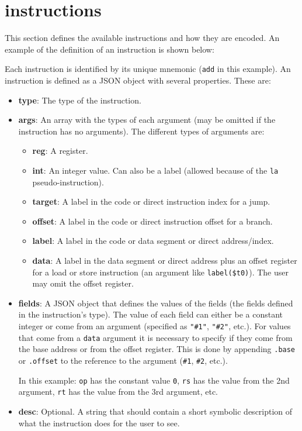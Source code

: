 \documentclass[11pt,a4paper,twoside,titlepage]{report}
\begin{document}
\section{instructions}

This section defines the available instructions and how they are encoded.
An example of the definition of an instruction is shown below:



Each instruction is identified by its unique mnemonic (\verb+add+ in this example).
An instruction is defined as a JSON object with several properties. These are:

\begin{itemize}
	\item \textbf{type}: The type of the instruction.
	\item \textbf{args}: An array with the types of each argument (may be omitted if
		the instruction has no arguments).
		The different types of arguments are:
		\begin{itemize}
			\item \textbf{reg}: A register.
			\item \textbf{int}: An integer value. Can also be a label (allowed because 
				of the \verb+la+ pseudo-instruction).
			\item \textbf{target}: A label in the code or direct instruction index for 
				a jump.
			\item \textbf{offset}: A label in the code or direct instruction offset 
				for a branch.
			\item \textbf{label}: A label in the code or data segment or direct 
				address/index.
			\item \textbf{data}: A label in the data segment or direct address plus
				an offset register for a load or store instruction (an argument like
				\verb+label($t0)+). The user may omit the offset register.
		\end{itemize}
	\item \textbf{fields}: A JSON object that defines the values of the fields
		(the fields defined in the instruction's type). The value of each field
		can either be a constant integer or come from an argument (specified as
		\verb+"#1"+, \verb+"#2"+, etc.).
		For values that come from a \verb+data+ argument it is necessary to
		specify if they come from the base address or from the offset register.
		This is done by appending \verb+.base+ or \verb+.offset+ to the reference
		to the argument (\verb+#1+, \verb+#2+, etc.).
		
		In this example: \verb+op+ has the constant value \verb+0+, \verb+rs+
		has the value from the 2nd argument, \verb+rt+ has the value from the 3rd
		argument, etc.
	\item \textbf{desc}: Optional. A string that should contain a short symbolic
		description of what the instruction does for the user to see.
\end{itemize}
\end{document}
